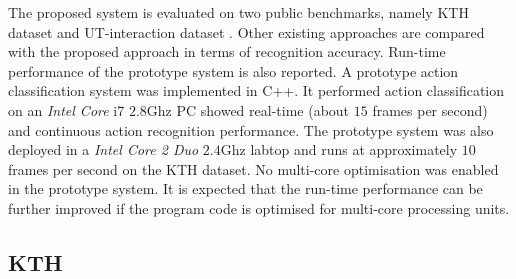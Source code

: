 The proposed system is evaluated on two public benchmarks, namely KTH dataset \cite{Schuldt2004} and UT-interaction dataset \cite{Ryoo2010}. 
Other existing approaches are compared with the proposed approach in terms of recognition accuracy. 
Run-time performance of the prototype system is also reported. A prototype action classification system was implemented in C++. It performed action classification on an \emph{Intel Core}\texttrademark \; i7 $2.8$Ghz PC showed real-time (about $15$ frames per second) and continuous action recognition performance. 
The prototype system was also deployed in a \emph{Intel Core 2 Duo} $2.4$Ghz labtop and runs at approximately $10$ frames per second on the KTH dataset. 
No multi-core optimisation was enabled in the prototype system. It is expected that the run-time performance can be further improved if the program code is optimised for multi-core processing units.



\subsection{KTH}

